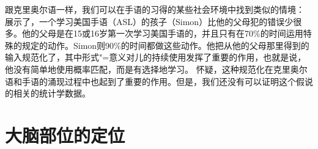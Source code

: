 跟克里奥尔语一样，我们可以在手语的习得的某些社会环境中找到类似的情境： \citet{SN2004a}展示了，一个学习美国手语（ASL）的孩子（Simon）比他的父母犯的错误少很多。他的父母是在15或16岁第一次学习美国手语的，并且只有在70\%的时间运用特殊的规定的动作。Simon则90\%的时间都做这些动作。他把从他的父母那里得到的输入规范化了，其中形式"=意义对儿的持续使用发挥了重要的作用，也就是说，他没有简单地使用概率匹配，而是有选择地学习。 \citet[]{SN2004a}怀疑，这种规范化在克里奥尔语和手语的涌现过程中也起到了重要的作用。但是，我们还没有可以证明这个假说的相关的统计学数据。


\section{大脑部位的定位}

